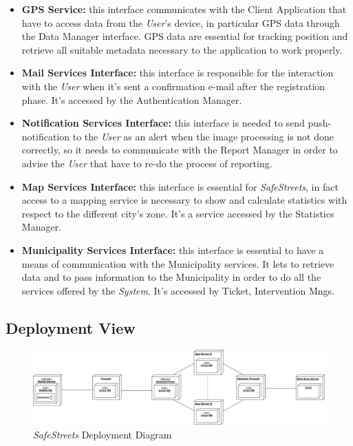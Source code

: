 \documentclass{article}
\begin{document}
		\begin{itemize}
			\item {\bf GPS Service:} this interface communicates with the Client Application that have to access data from the {\it User}'s device, in particular GPS data through the Data Manager interface. GPS data are essential for tracking position and retrieve all suitable metadata necessary to the application to work properly. 
			\item {\bf Mail Services Interface:} this interface is responsible for the interaction with the {\it User} when it's sent a confirmation e-mail after the registration phase. It's accessed by the Authentication Manager.
			\item {\bf Notification Services Interface:} this interface is needed to send push-notification to the {\it User} as an alert when the image processing is not done correctly, so it needs to communicate with the Report Manager in order to advise the {\it User} that have to re-do the process of reporting. 
			\item {\bf Map Services Interface:} this interface is essential for {\it SafeStreets}, in fact access to a mapping service is necessary to show and calculate statistics with respect to the different city's zone. It's a service accessed by the Statistics Manager.
			\item {\bf Municipality Services Interface:} this interface is essential to have a means of communication with the Municipality services. It lets to retrieve data and to pass information to the Municipality in order to do all the services offered by the {\it System}. It's accessed by Ticket, Intervention Mngs. 
		\end{itemize}
		
		\pagebreak
		
	\subsection{Deployment View}
		\begin{figure}[H]
			\centering
			\includegraphics[scale=0.25]{Images/Diagrams/deployment_diagram.png}
			\caption{{\it SafeStreets} Deployment Diagram}
		\end{figure}
		
\end{document}

